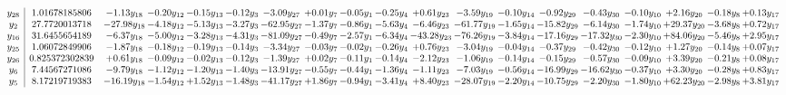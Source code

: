 \documentclass[9pt]{article}
\begin{document}
\[\begin{array}{c| c c@{\hskip 2pt} c@{\hskip 2pt} c@{\hskip 2pt} c@{\hskip 2pt} c@{\hskip 2pt} c@{\hskip 2pt} c@{\hskip 2pt} c@{\hskip 2pt} c@{\hskip 2pt} c@{\hskip 2pt} c@{\hskip 2pt} c@{\hskip 2pt} c@{\hskip 2pt} c@{\hskip 2pt} c@{\hskip 2pt} c@{\hskip 2pt} c@{\hskip 2pt} }
 y_{28}   &  1.01678185806 & -1.13 y_{18} & -0.20 y_{12} & -0.15 y_{13} & -0.12 y_{3} & -3.09 y_{27} & +  0.01 y_{7} & -0.05 y_{1} & -0.25 y_{4} & +  0.61 y_{23} & -3.59 y_{19} & -0.10 y_{14} & -0.92 y_{29} & -0.43 y_{30} & -0.10 y_{10} & +  2.16 y_{20} & -0.18 y_{8} & +  0.13 y_{17}\\
 y_{2}   &  27.7720013718 & -27.98 y_{18} & -4.18 y_{12} & -5.13 y_{13} & -3.27 y_{3} & -62.95 y_{27} & -1.37 y_{7} & -0.86 y_{1} & -5.63 y_{4} & -6.46 y_{23} & -61.77 y_{19} & -1.65 y_{14} & -15.82 y_{29} & -6.14 y_{30} & -1.74 y_{10} & + 29.37 y_{20} & -3.68 y_{8} & +  0.72 y_{17}\\
 y_{16}   &  31.6455654189 & -6.37 y_{18} & -5.00 y_{12} & -3.28 y_{13} & -4.31 y_{3} & -81.09 y_{27} & -0.49 y_{7} & -2.57 y_{1} & -6.34 y_{4} & -43.28 y_{23} & -76.26 y_{19} & -3.84 y_{14} & -17.16 y_{29} & -17.32 y_{30} & -2.30 y_{10} & + 84.06 y_{20} & -5.46 y_{8} & +  2.95 y_{17}\\
 y_{25}   &  1.06072849906 & -1.87 y_{18} & -0.18 y_{12} & -0.19 y_{13} & -0.14 y_{3} & -3.34 y_{27} & -0.03 y_{7} & -0.02 y_{1} & -0.26 y_{4} & +  0.76 y_{23} & -3.04 y_{19} & -0.04 y_{14} & -0.37 y_{29} & -0.42 y_{30} & -0.12 y_{10} & +  1.27 y_{20} & -0.14 y_{8} & +  0.07 y_{17}\\
 y_{26}   &  0.825372302839 & +  0.61 y_{18} & -0.09 y_{12} & -0.02 y_{13} & -0.12 y_{3} & -1.39 y_{27} & +  0.02 y_{7} & -0.11 y_{1} & -0.14 y_{4} & -2.12 y_{23} & -1.06 y_{19} & -0.14 y_{14} & -0.15 y_{29} & -0.57 y_{30} & -0.09 y_{10} & +  3.39 y_{20} & -0.21 y_{8} & +  0.08 y_{17}\\
 y_{6}   &  7.44567271086 & -9.79 y_{18} & -1.12 y_{12} & -1.20 y_{13} & -1.40 y_{3} & -13.91 y_{27} & -0.55 y_{7} & -0.44 y_{1} & -1.36 y_{4} & -1.11 y_{23} & -7.03 y_{19} & -0.56 y_{14} & -16.99 y_{29} & -16.62 y_{30} & -0.37 y_{10} & +  3.30 y_{20} & -0.28 y_{8} & +  0.83 y_{17}\\
 y_{5}   &  8.17219719383 & -16.19 y_{18} & -1.54 y_{12} & +  1.52 y_{13} & -1.48 y_{3} & -41.17 y_{27} & +  1.86 y_{7} & -0.94 y_{1} & -3.41 y_{4} & +  8.40 y_{23} & -28.07 y_{19} & -2.20 y_{14} & -10.75 y_{29} & -2.20 y_{30} & -1.80 y_{10} & + 62.23 y_{20} & -2.98 y_{8} & +  3.81 y_{17}\\

\end{array}\]
\end{document}
